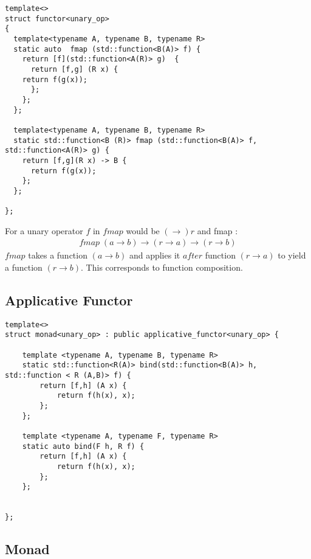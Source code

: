 \documentclass[12pt,fleqn]{article}
\begin{document}
%
%
%
\begin{minipage}{\linewidth}
\begin{lstlisting}[caption=functor for unary operators, label=funop]
template<>
struct functor<unary_op>
{
  template<typename A, typename B, typename R>
  static auto  fmap (std::function<B(A)> f) {  
    return [f](std::function<A(R)> g)  {
      return [f,g] (R x) {
	return f(g(x));
      };
    };
  };

  template<typename A, typename B, typename R>
  static std::function<B (R)> fmap (std::function<B(A)> f, std::function<A(R)> g) {  
    return [f,g](R x) -> B {
      return f(g(x));
    };
  };

};
\end{lstlisting}
\end{minipage}
%
%
%

For a unary operator $f$ in $fmap$  would be $(\rightarrow) r$ and fmap :
\begin{eqnarray*}
fmap \; (a \rightarrow b) \rightarrow (r \rightarrow a) \rightarrow (r \rightarrow b)
\end{eqnarray*}
$fmap$ takes a function $(a\rightarrow b)$ and applies it $after$ function $(r \rightarrow a)$ to yield a function $(r \rightarrow b)$.
This corresponds to function composition.

%
%
\subsection{Applicative Functor}
%
%
\begin{minipage}{\linewidth}
\begin{lstlisting}[caption=applicative functor for unary operators, label=appfunop]
template<>
struct monad<unary_op> : public applicative_functor<unary_op> {

	template <typename A, typename B, typename R>
	static std::function<R(A)> bind(std::function<B(A)> h, std::function < R (A,B)> f) {
		return [f,h] (A x) {
			return f(h(x), x);
		};
	};
	
	template <typename A, typename F, typename R>
	static auto bind(F h, R f) {
		return [f,h] (A x) {
			return f(h(x), x);
		};
	};
	
	
};
\end{lstlisting}
\end{minipage}


\subsection{Monad}
\end{document}

